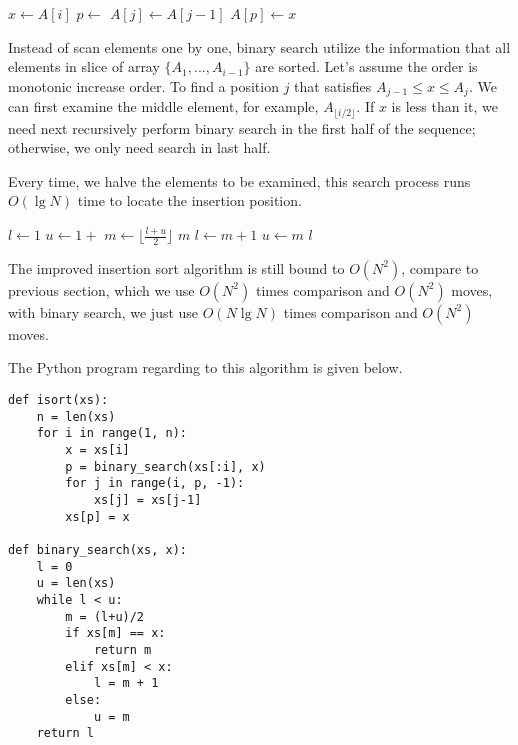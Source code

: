 \documentclass{article}
\begin{document}
\begin{algorithmic}
    \State $x \gets A[i]$
    \State $p \gets $ 
      \State $A[j] \gets A[j-1]$
    \EndFor
    \State $A[p] \gets x$
  \EndFor
\EndFunction
\end{algorithmic}

Instead of scan elements one by one, binary search utilize the information
that all elements in slice of array $\{A_1, ..., A_{i-1} \}$ are sorted. 
Let's assume
the order is monotonic increase order. To find a position $j$ that satisfies
$A_{j-1} \leq x \leq A_{j}$. We can first examine the middle element, for 
example, $A_{\lfloor i/2 \rfloor}$. If $x$ is less than it, we need next recursively
perform binary search in the first half of the sequence; otherwise, we
only need search in last half.

Every time, we halve the elements to be examined, this search process runs
$O(\lg N)$ time to locate the insertion position.

\begin{algorithmic}
  \State $l \gets 1$
  \State $u \gets 1+$ 
    \State $m \gets \lfloor \frac{l+u}{2} \rfloor$
      \State \Return $m$ 
      \State $l \gets m+1$
    \Else
      \State $u \gets m$
    \EndIf
  \EndWhile
  \State \Return $l$
\EndFunction
\end{algorithmic}

The improved insertion sort algorithm is still bound to $O(N^2)$, 
compare to previous section, which we use $O(N^2)$ times comparison and
$O(N^2)$ moves, with binary search, we just use $O(N \lg N)$ times 
comparison and $O(N^2)$ moves.

The Python program regarding to this algorithm is given below.

\lstset{language=Python}
\begin{lstlisting}
def isort(xs):
    n = len(xs)
    for i in range(1, n):
        x = xs[i]
        p = binary_search(xs[:i], x)
        for j in range(i, p, -1):
            xs[j] = xs[j-1]
        xs[p] = x

def binary_search(xs, x):
    l = 0
    u = len(xs)
    while l < u:
        m = (l+u)/2
        if xs[m] == x:
            return m 
        elif xs[m] < x:
            l = m + 1
        else:
            u = m
    return l
\end{lstlisting}
\end{document}
